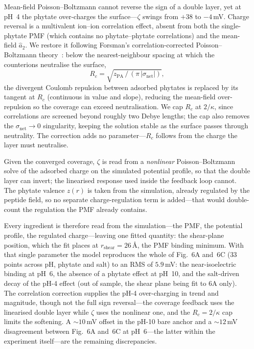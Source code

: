 \documentclass[11pt]{article}
\begin{document}
Mean-field Poisson--Boltzmann cannot reverse the sign of a double layer, yet at
pH~4 the phytate over-charges the surface---$\zeta$ swings from $+38$ to
$-4$\,mV.  Charge reversal is a multivalent ion--ion correlation effect, absent
from both the single-phytate PMF (which contains no phytate--phytate
correlations) and the mean-field $\hat a_2$.  We restore it following Forsman's
correlation-corrected Poisson--Boltzmann theory~\cite{Forsman2004}: below the
nearest-neighbour spacing at which the counterions neutralise the surface,
\begin{equation}\label{eq:Rc}
R_c = \sqrt{z_\text{PA}\,/\,(\pi\,|\sigma_\text{net}|)},
\end{equation}
the divergent Coulomb repulsion between adsorbed phytates is replaced by its
tangent at $R_c$ (continuous in value and slope), reducing the mean-field
over-repulsion so the coverage can exceed neutralisation.  We cap $R_c$ at
$2/\kappa$, since correlations are screened beyond roughly two Debye lengths; the
cap also removes the $\sigma_\text{net}\!\to\!0$ singularity, keeping the solution
stable as the surface passes through neutrality.  The correction adds no
parameter---$R_c$ follows from the charge the layer must neutralise.

Given the converged coverage, $\zeta$ is read from a \emph{nonlinear}
Poisson--Boltzmann solve of the adsorbed charge on the simulated potential
profile, so that the double layer can invert; the linearised response used inside
the feedback loop cannot.  The phytate valence $z(r)$ is taken from the
simulation, already regulated by the peptide field, so no separate
charge-regulation term is added---that would double-count the regulation the PMF
already contains.

Every ingredient is therefore read from the simulation---the PMF, the potential
profile, the regulated charge---leaving one fitted quantity: the shear-plane
position, which the fit places at $r_\text{shear}=26$\,\AA, the PMF binding minimum.
With that single parameter the model reproduces the whole of Fig.~6A and~6C ($33$
points across pH, phytate and salt) to an RMS of $5.9$\,mV: the near-isoelectric
binding at pH~6, the absence of a phytate effect at pH~10, and the salt-driven
decay of the pH-4 effect (out of sample, the shear plane being fit to 6A only).
The correlation correction supplies the pH-4 over-charging in trend and
magnitude, though not the full sign reversal---the coverage feedback uses the
linearised double layer while $\zeta$ uses the nonlinear one, and the
$R_c=2/\kappa$ cap limits the softening.  A $\sim\!10$\,mV offset in the pH-10
bare anchor and a $\sim\!12$\,mV disagreement between Fig.~6A and~6C at pH~6---the
latter within the experiment itself---are the remaining discrepancies.



\end{document}
